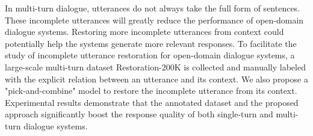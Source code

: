 In multi-turn dialogue, utterances do not always take the full form of sentences. These incomplete utterances will greatly reduce the performance of open-domain dialogue systems. Restoring more incomplete utterances from context could potentially help the systems generate more relevant responses. To facilitate the study of incomplete utterance restoration for open-domain dialogue systems, a large-scale multi-turn dataset Restoration-200K is collected and manually labeled with the explicit relation between an utterance and its context. We also propose a "pick-and-combine" model to restore the incomplete utterance from its context. Experimental results demonstrate that the annotated dataset and the proposed approach significantly boost the response quality of both single-turn and multi-turn dialogue systems.